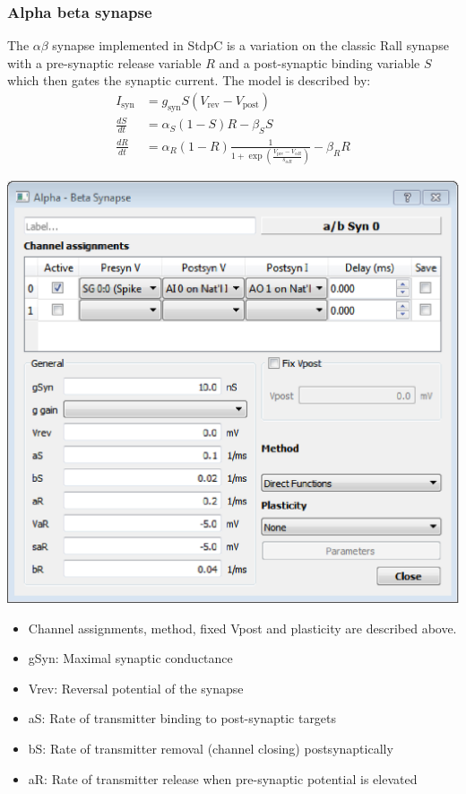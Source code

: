 \documentclass{article}
\begin{document}
\subsubsection{Alpha beta synapse}
The $\alpha\beta$ synapse implemented in StdpC is a variation on the
classic Rall synapse \cite{Rall1967} with a pre-synaptic release variable $R$ and a
post-synaptic binding variable $S$ which then gates the synaptic
current. The model is described by:
\begin{align}
I_{\text{syn}}&= g_{\text{syn}} S (V_{\text{rev}} -
V_{\text{post}}) \\
 \frac{dS}{dt} &= \alpha_S (1-S)R - \beta_S S  \\
 \frac{dR}{dt} &= \alpha_R (1-R) \frac{1}{1+
   \exp (\frac{V_{\text{pre}}-V_{\alpha R}}{s_{\alpha R}})} -
 \beta_R R  
\end{align}
\parbox[b]{0.58\textwidth}{
\includegraphics[scale=0.5]{abSynDialog}\\}
\hfill
\parbox[b]{0.4\textwidth}{
\begin{itemize}
\item Channel assignments, method, fixed Vpost and plasticity are described above.
\item gSyn: Maximal synaptic conductance
\item Vrev: Reversal potential of the synapse
\item aS: Rate of transmitter binding to post-synaptic targets
\item bS: Rate of transmitter removal (channel closing)
  postsynaptically
\item aR: Rate of transmitter release when pre-synaptic potential is
  elevated
\end{itemize}
}
\end{document}

